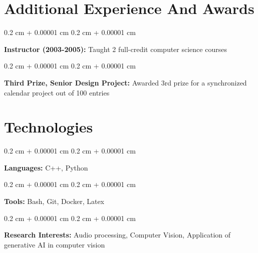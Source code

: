 \documentclass[10pt, letterpaper]{article}
\newenvironment{onecolentry}{
    \begin{adjustwidth}{
        0.2 cm + 0.00001 cm
    }{
        0.2 cm + 0.00001 cm
    }
}{
    \end{adjustwidth}
} %
\begin{document}
    
    \section{Additional Experience And Awards}



        
        \begin{onecolentry}
            \textbf{Instructor (2003-2005):} Taught 2 full-credit computer science courses
        \end{onecolentry}

        \vspace{0.2 cm}

        \begin{onecolentry}
            \textbf{Third Prize, Senior Design Project:} Awarded 3rd prize for a synchronized calendar project out of 100 entries
        \end{onecolentry}


    
    \section{Technologies}



        
        \begin{onecolentry}
            \textbf{Languages:} C++, Python
        \end{onecolentry}

        \vspace{0.2 cm}

        \begin{onecolentry}
            \textbf{Tools:} Bash, Git, Docker, Latex
        \end{onecolentry}

        \vspace{0.2 cm}

        \begin{onecolentry}
            \textbf{Research Interests:} Audio processing, Computer Vision, Application of generative AI in computer vision
        \end{onecolentry}


    
\end{document}
